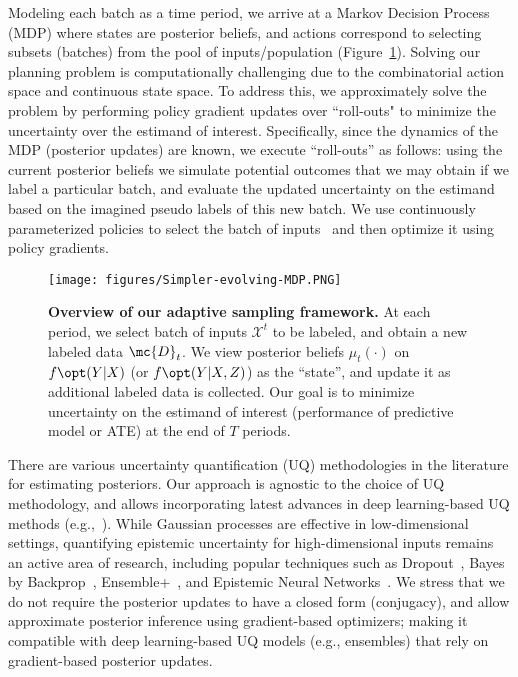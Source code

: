 Modeling each batch as a time
period, we arrive at a Markov Decision Process (MDP) where states are posterior
beliefs, and actions correspond to 
selecting subsets (batches) from the pool of inputs/population (Figure~\ref{fig:overview}).
 Solving our planning problem 
is computationally challenging due to the
combinatorial action space and continuous state space. To address this, we approximately solve the problem by performing policy gradient updates over ``roll-outs" to minimize the uncertainty over the estimand of interest. Specifically, since the dynamics
of the MDP (posterior updates) are known, we execute ``roll-outs'' as follows: using the
current posterior beliefs we simulate potential outcomes that we may obtain if we label a particular batch,  and evaluate the updated uncertainty on 
the estimand
based on the imagined pseudo labels of this new batch.
We use continuously parameterized policies to select the batch of inputs~\citep{EfraimidisSp06} and then optimize it using policy gradients. 


\begin{figure}[t]
\vspace{-1.5cm}
\centering \texttt{[image: figures/Simpler-evolving-MDP.PNG]}
\caption{\textbf{Overview of our adaptive sampling framework.}  At each
period, we select batch of inputs $\mathcal{X}^t$ to be labeled, and obtain a new
labeled data $\mc{D}_t$.  We view posterior beliefs $\mu_t(\cdot)$ on
$f\opt(Y|X)$ (or $f\opt(Y|X,Z)$) as the ``state'', and update it as additional labeled data is
collected. Our goal is to minimize uncertainty on the estimand of interest (performance of predictive model or ATE) at the end of $T$ periods.
}
\label{fig:overview}
\vspace{-.5cm}
\end{figure}

There are various uncertainty quantification (UQ) methodologies in the literature for estimating posteriors.   
Our approach is agnostic to the choice of  UQ methodology, and allows incorporating latest advances in deep 
learning-based UQ methods
(e.g.,~\citep{DuLiXuSpWuRuMa20, OsbandWenAsDwIbLuRo23}). While
Gaussian processes are effective in low-dimensional settings, quantifying epistemic uncertainty for high-dimensional inputs remains an active area of research, including
popular techniques such as Dropout~\citep{GalGh16}, Bayes by Backprop~\citep{Blundell15}, Ensemble+~\citep{LakshminarayananPrBl17,OsbandAsCa18}, and Epistemic Neural Networks~\citep{OsbandWenAsDwIbLuRo23}.
We stress that we do not require the posterior
updates to have a closed form (conjugacy),
and allow approximate posterior
inference using gradient-based optimizers; making it compatible with deep learning-based UQ models (e.g., ensembles) 
that rely on gradient-based posterior updates.

